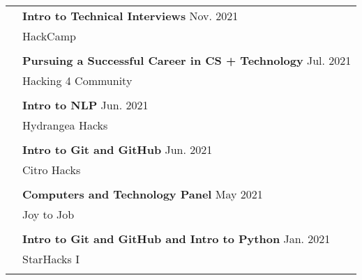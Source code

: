 \documentclass[letterpaper, 11pt]{article}
\begin{document}
\begin{longtable}{p{1.3in}p{4.8in}}
& \textbf{Intro to Technical Interviews} \hfill Nov. 2021 \\
& HackCamp \\
& \\

& \textbf{Pursuing a Successful Career in CS + Technology} \hfill Jul. 2021 \\
& Hacking 4 Community \\
& \\

& \textbf{Intro to NLP} \hfill Jun. 2021 \\
& Hydrangea Hacks \\
& \\

& \textbf{Intro to Git and GitHub} \hfill Jun. 2021 \\
& Citro Hacks \\
& \\

& \textbf{Computers and Technology Panel} \hfill May 2021 \\
& Joy to Job \\
& \\

& \textbf{Intro to Git and GitHub and Intro to Python} \hfill Jan. 2021 \\
& StarHacks I \\
& \\




\end{longtable}
\end{document}
